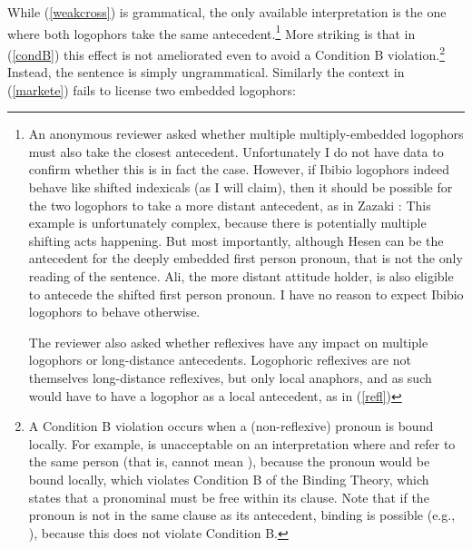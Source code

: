 \documentclass[output=paper]{langscibook}
\begin{document}
While (\ref{weakcross}) is grammatical, the only available interpretation is the one where both logophors take the same antecedent.\footnote{An 
    anonymous reviewer asked whether multiple multiply-embedded logophors must also take the closest antecedent. Unfortunately I do not have data to confirm whether this is in fact the case. However, if Ibibio logophors indeed behave like shifted indexicals (as I will claim), then it should be possible for the two logophors to take a more distant antecedent, as in Zazaki \citep{Anand2004}:
    \bex
    	\label{complicated}
    \fex
    This example is unfortunately complex, because there is potentially multiple shifting acts happening. But most importantly, although Hesen \alert{can} be the antecedent for the deeply embedded first person pronoun, that is not the only reading of the sentence. Ali, the more distant attitude holder, is also eligible to antecede the shifted first person pronoun. I have no reason to expect Ibibio logophors to behave otherwise.
    
    The reviewer also asked whether reflexives have any impact on multiple logophors or long-distance antecedents. Logophoric reflexives are not themselves long-distance reflexives, but only local anaphors, and as such would have to have a logophor as a local antecedent, as in (\ref{refl})
}
More striking is that in (\ref{condB}) this effect is not ameliorated even to avoid a Condition B violation.\footnote{A
    Condition B violation occurs when a (non-reflexive) pronoun is bound locally. For example,  is unacceptable on an interpretation where  and  refer to the same person (that is,  cannot mean ), because the pronoun would be bound locally, which violates Condition B of the Binding Theory, which states that a pronominal must be free within its clause. Note that if the pronoun is not in the same clause as its antecedent, binding is possible (e.g., ), because this does not violate Condition B.
}
Instead, the sentence is simply ungrammatical. Similarly the context in (\ref{markete}) fails to license two embedded logophors:
\end{document}
